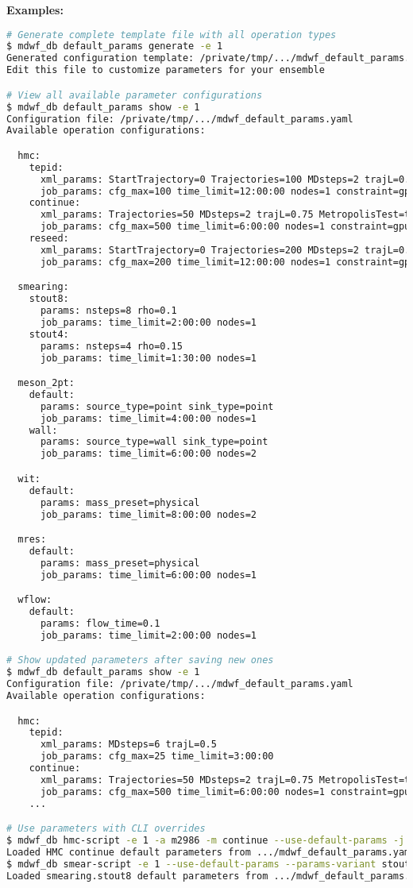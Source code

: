 \documentclass{article}
\begin{document}
\textbf{Examples:}
\begin{lstlisting}[language=bash]
# Generate complete template file with all operation types
$ mdwf_db default_params generate -e 1
Generated configuration template: /private/tmp/.../mdwf_default_params.yaml
Edit this file to customize parameters for your ensemble

# View all available parameter configurations
$ mdwf_db default_params show -e 1
Configuration file: /private/tmp/.../mdwf_default_params.yaml
Available operation configurations:

  hmc:
    tepid:
      xml_params: StartTrajectory=0 Trajectories=100 MDsteps=2 trajL=0.75 MetropolisTest=false
      job_params: cfg_max=100 time_limit=12:00:00 nodes=1 constraint=gpu cpus_per_task=32
    continue:
      xml_params: Trajectories=50 MDsteps=2 trajL=0.75 MetropolisTest=true
      job_params: cfg_max=500 time_limit=6:00:00 nodes=1 constraint=gpu cpus_per_task=32
    reseed:
      xml_params: StartTrajectory=0 Trajectories=200 MDsteps=2 trajL=0.75 MetropolisTest=true
      job_params: cfg_max=200 time_limit=12:00:00 nodes=1 constraint=gpu cpus_per_task=32

  smearing:
    stout8:
      params: nsteps=8 rho=0.1
      job_params: time_limit=2:00:00 nodes=1
    stout4:
      params: nsteps=4 rho=0.15
      job_params: time_limit=1:30:00 nodes=1

  meson_2pt:
    default:
      params: source_type=point sink_type=point
      job_params: time_limit=4:00:00 nodes=1
    wall:
      params: source_type=wall sink_type=point
      job_params: time_limit=6:00:00 nodes=2

  wit:
    default:
      params: mass_preset=physical
      job_params: time_limit=8:00:00 nodes=2

  mres:
    default:
      params: mass_preset=physical
      job_params: time_limit=6:00:00 nodes=1

  wflow:
    default:
      params: flow_time=0.1
      job_params: time_limit=2:00:00 nodes=1

# Show updated parameters after saving new ones
$ mdwf_db default_params show -e 1
Configuration file: /private/tmp/.../mdwf_default_params.yaml
Available operation configurations:

  hmc:
    tepid:
      xml_params: MDsteps=6 trajL=0.5
      job_params: cfg_max=25 time_limit=3:00:00
    continue:
      xml_params: Trajectories=50 MDsteps=2 trajL=0.75 MetropolisTest=true
      job_params: cfg_max=500 time_limit=6:00:00 nodes=1 constraint=gpu cpus_per_task=32
    ...

# Use parameters with CLI overrides  
$ mdwf_db hmc-script -e 1 -a m2986 -m continue --use-default-params -j "nodes=2"
Loaded HMC continue default parameters from .../mdwf_default_params.yaml
$ mdwf_db smear-script -e 1 --use-default-params --params-variant stout8
Loaded smearing.stout8 default parameters from .../mdwf_default_params.yaml
\end{lstlisting}
\end{document}
